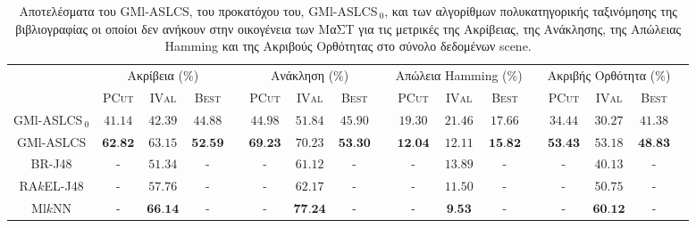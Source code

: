 \begin{landscape}
\begin{table}
\begin{center}
\caption[Αποτελέσματα στο σύνολο δεδομένων scene.]{Αποτελέσματα του GMl-ASLCS, του προκατόχου του, GMl-ASLCS$_{\:0}$, και των αλγορίθμων πολυκατηγορικής ταξινόμησης της βιβλιογραφίας οι οποίοι δεν ανήκουν στην οικογένεια των ΜαΣΤ για τις μετρικές της Ακρίβειας, της Ανάκλησης, της Απώλειας Hamming και της Ακριβούς Ορθότητας στο σύνολο δεδομένων scene.}
\label{table:sceneEvals}
\begin{tabular}{ccccccccccccccccc}
 & \multicolumn{3}{c}{Ακρίβεια (\%)} & & \multicolumn{3}{c}{Ανάκληση (\%)} & & \multicolumn{3}{c}{Απώλεια Hamming (\%)} & & \multicolumn{3}{c}{Ακριβής Ορθότητα (\%)}
\\ 
\cline{2-4} \cline{6-8} \cline{10-12} \cline{14-16}
& \textsc{PCut} & \textsc{IVal} & \textsc{Best} & & \textsc{PCut} & \textsc{IVal} & \textsc{Best} & & \textsc{PCut} & \textsc{IVal} & \textsc{Best} & & \textsc{PCut} & \textsc{IVal} & \textsc{Best}\\ \hline
GMl-ASLCS$_{\:0}$ & $41.14$ & $42.39$ & $44.88$ & & $44.98$ & $51.84$ & $45.90$ & & $19.30$ & $21.46$ & $17.66$ & & $34.44$ & $30.27$ & $41.38$ \\ 
GMl-ASLCS 		  & $\textbf{62.82}$ & $63.15$ & $\textbf{52.59}$ & & $\textbf{69.23}$ & $70.23$ & $\textbf{53.30}$ & & $\textbf{12.04}$	& $12.11$ & $\textbf{15.82}$	& & $\textbf{53.43}$ & $53.18$	& $\textbf{48.83}$ \\
\hline
\hline
BR-J48 			  & - & $51.34$ & - & & - & $61.12$ & - & & -	& $13.89$ & -	& & - & $40.13$	& - \\
RA$k$EL-J48 	  & - & $57.76$ & - & & - & $62.17$ & - & & -	& $11.50$ & -	& & - & $50.75$	& - \\
Ml$k$NN 		  & - & $\textbf{66.14}$ & - & & - & $\textbf{77.24}$ & - & & -	& $\textbf{9.53}$  & -	& & - & $\textbf{60.12}$	& - \\
\hline

\end{tabular} 
\end{center}
\end{table}
\end{landscape}


